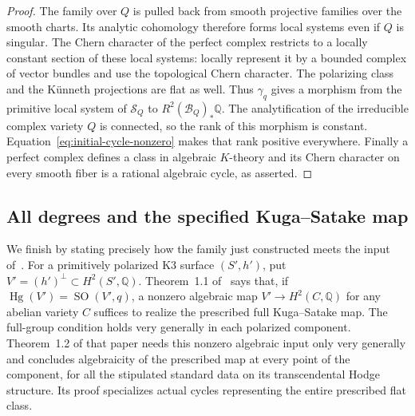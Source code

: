 \documentclass[11pt]{article}
\numberwithin{equation}{section}
\theoremstyle{definition}
\theoremstyle{remark}
\newcommand{\Q}{\mathbb Q}
\newcommand{\SO}{\operatorname{SO}}
\begin{document}
\begin{proof}
The family over $Q$ is pulled back from smooth projective families
over the smooth charts. Its analytic cohomology therefore forms
local systems even if $Q$ is singular. The Chern character of the
perfect complex restricts to a locally constant section of these
local systems: locally represent it by a bounded complex of vector
bundles and use the topological Chern character. The polarizing
class and the K\"unneth projections are flat as well. Thus
$\gamma_q$ gives a morphism from the primitive local system of
$\mathcal S_Q$ to $R^2(\mathcal B_Q)_*\Q$. The analytification
of the irreducible complex variety $Q$ is connected, so the rank
of this morphism is constant. Equation~\eqref{eq:initial-cycle-nonzero}
makes that rank positive everywhere. Finally a perfect complex
defines a class in algebraic $K$-theory and its Chern character
on every smooth fiber is a rational algebraic cycle, as asserted.
\end{proof}

\subsection{All degrees and the specified Kuga--Satake map}

We finish by stating precisely how the family just constructed meets
the input of~\cite{R}. For a primitively polarized K3 surface
$(S',h')$, put $V'=(h')^\perp\subset H^2(S',\Q)$.
Theorem~1.1 of~\cite{R} says that, if
$\operatorname{Hg}(V')=\SO(V',q)$, a nonzero algebraic map
$V'\to H^2(C,\Q)$ for any abelian variety $C$ suffices to realize
the prescribed full Kuga--Satake map. The full-group condition
holds very generally in each polarized component.
Theorem~1.2 of that paper needs this nonzero algebraic input only
very generally and concludes algebraicity of the prescribed map
at every point of the component, for all the stipulated standard
data on its transcendental Hodge structure. Its proof specializes
actual cycles representing the entire prescribed flat class.
\end{document}
